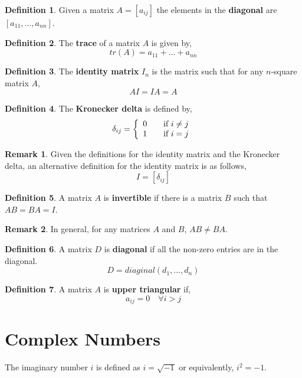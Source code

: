 \documentclass{report}
\theoremstyle{definition}
\newtheorem{_def}{Definition}
\newtheorem{_rem}{Remark}
\begin{document}
\begin{_def}
Given a matrix $A=[a_{ij}]$ the elements in the \textbf{diagonal} are $[a_{11},...,a_{nn}]$.
\end{_def}

\begin{_def}
The \textbf{trace} of a matrix $A$ is given by,
\[tr(A)=a_{11}+...+a_{nn}\]
\end{_def}

\begin{_def}
The \textbf{identity matrix} $I_n$ is the matrix such that for any $n$-square matrix $A$,
\[AI=IA=A\]
\end{_def}

\begin{_def}
The \textbf{Kronecker delta} is defined by,
\[\delta_{ij}=\left\{ 
  \begin{array}{l l}
    0 & \quad \text{if } i\neq j\\
    1 & \quad \text{if } i=j
  \end{array} \right.\]
\end{_def}

\begin{_rem}
Given the definitions for the identity matrix and the Kronecker delta, an alternative definition for the identity matrix is as follows,
\[I=[\delta_{ij}]\]
\end{_rem}

\begin{_def}
A matrix $A$ is \textbf{invertible} if there is a matrix $B$ such that $AB=BA=I$.
\end{_def}

\begin{_rem}
In general, for any matrices $A$ and $B$, $AB\neq BA$.
\end{_rem}

\begin{_def}
A matrix $D$ is \textbf{diagonal} if all the non-zero entries are in the diagonal.
\[D=diaginal(d_1,...,d_n)\]
\end{_def}

\begin{_def}
A matrix $A$ is \textbf{upper triangular} if,
\[a_{ij}=0 \quad \forall i>j\]
\end{_def}

\section{Complex Numbers}

The imaginary number $i$ is defined as $i=\sqrt{-1}$ or equivalently, $i^2=-1$.
\end{document}
